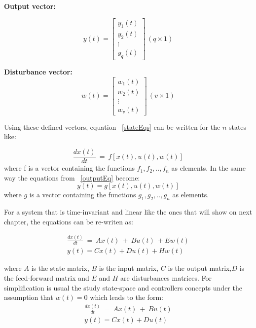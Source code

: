  \textbf{ Output vector:}
 
   \begin{equation}
y(t)=
 \left[
 \begin{matrix}
 y_1(t)\\
 y_2(t)\\
 \vdots\\
 y_q(t)
 \end{matrix}
 \right] \, (q\times 1)
 \end{equation}
 
\textbf{ Disturbance vector:}
    \begin{equation}
 w(t)=
 \left[
 \begin{matrix}
 w_1(t)\\
 w_2(t)\\
 \vdots\\
 w_v(t)
 \end{matrix}
 \right] \, (v\times 1)
 \end{equation}
 
 Using these defined vectors, equation ~\ref{stateEqs} can be written for the $n$ states like:\smallskip
 
 \begin{equation}
 	\frac{dx(t)}{dt}~=~ f[x(t),u(t),w(t)]
 \end{equation} 
 where f is a vector containing the functions $f_1,f_2,..,f_n$ as elements. In the same way the equations from ~\ref{outputEq} become:
 \begin{equation}
 	y(t)=g[x(t),u(t),w(t)]
 \end{equation}
 where $g$ is a vector containing the functions $g_1,g_2,..,g_n$ as elements.
 
 For a system that is time-invariant and linear like the ones that will show on next chapter, the equations can be re-writen as:
 
 \begin{align}
	\frac{dx(t)}{dt}~=~ Ax(t)~+~Bu(t)~+Ew(t) \\
	y(t)=Cx(t)+Du(t)+Hw(t)
 \end{align}

  where $A$ is the state matrix, $B$ is the input matrix, $C$ is the output matrix,$D$ is the feed-forward matrix and  $E$ and $H$ are disturbances matrices. For simplification is usual the study state-space and controllers concepts under the assumption that $w(t) =0$ which leads to the form:
 \smallskip
 \begin{align}
 	 \frac{dx(t)}{dt}~=~ Ax(t)~+~Bu(t)\\
 	  y(t)=Cx(t)+Du(t)
 	  \label{SS_eqs}
 \end{align}

